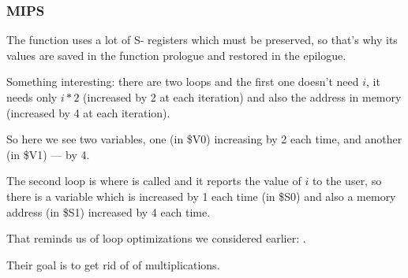 ﻿\subsubsection{MIPS}

The function uses a lot of S- registers which must be preserved, so that's why its 
values are saved in the function prologue and restored in the epilogue.



Something interesting: there are two loops and the first one doesn't need $i$, it needs only 
$i*2$ (increased by 2 at each iteration) and also the address in memory (increased by 4 at each iteration).

So here we see two variables, one (in \$V0) increasing by 2 each time, and another (in \$V1) --- by 4.

The second loop is where \printf is called and it reports the value of $i$ to the user, 
so there is a variable
which is increased by 1 each time (in \$S0) and also a memory address (in \$S1) increased by 4 each time.

That reminds us of loop optimizations we considered earlier: .

Their goal is to get rid of of multiplications.

